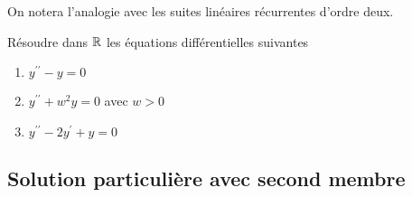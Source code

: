 \documentclass[a4paper, 11pt]{article}
\begin{document}
\begin{rem}
On notera l'analogie avec les suites lin\'eaires r\'ecurrentes d'ordre deux.
\end{rem}

{\footnotesize \begin{exercice} 
R\'esoudre dans $\mathbb{R}$ les \'equations diff\'erentielles suivantes
\begin{enumerate}
\item $y^{\prime\prime}-y=0$ 
\item $y^{\prime\prime}+w^2y=0$ avec $w>0$
\item $y^{\prime\prime}-2y^{\prime}+y=0$
\end{enumerate}
\end{exercice}
}




\subsection{Solution particuli\`ere  avec second membre}
\end{document}
